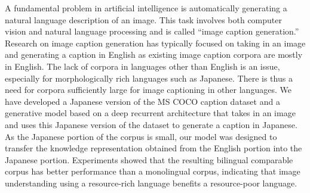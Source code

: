 A fundamental problem in artificial intelligence is automatically generating a natural language description of an image. This task involves both computer vision and natural language processing and is called ``image caption generation.'' Research on image caption generation has typically focused on taking in an image and generating a caption in English as existing image caption corpora are mostly in English. The lack of corpora in languages other than English is an issue, especially for morphologically rich languages such as Japanese. There is thus a need for corpora sufficiently large for image captioning in other languages. We have developed a Japanese version of the MS COCO caption dataset and a generative model based on a deep recurrent architecture that takes in an image and uses this Japanese version of the dataset to generate a caption in Japanese. As the Japanese portion of the corpus is small, our model was designed to transfer the knowledge representation obtained from the English portion into the Japanese portion. Experiments showed that the resulting bilingual comparable corpus has better performance than a monolingual corpus, indicating that image understanding using a resource-rich language benefits a resource-poor language.
